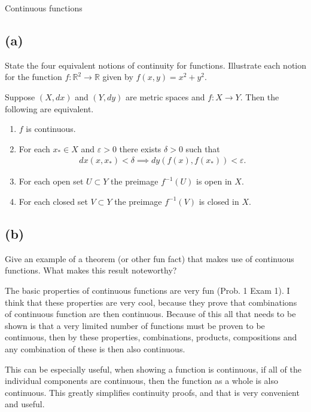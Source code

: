 \documentclass[12pt]{amsart}
\newcommand{\prob}[1]{Prob. #1}
\newcommand{\R}{\mathbb{R}}
\begin{document}
Continuous functions

\subsection*{(a)}%
\label{sub:_a_}

State the four equivalent notions of continuity for functions. Illustrate each
notion for the function $f:\R^2\to\R$ given by $f(x,y)=x^2+y^2$.

Suppose $(X,dx)$ and $(Y,dy)$ are metric spaces and $f:X\to Y$. Then the
following are equivalent.

\begin{enumerate}
  \item $f$ is continuous.
  \item For each $x_*\in X$ and $\varepsilon >0$ there exists $\delta >0$ such
    that
    \begin{align*}
      dx(x,x_*)<\delta\implies dy(f(x),f(x_*))<\varepsilon.
    \end{align*}
  \item For each open set $U\subset Y$ the preimage $f^{-1}(U)$ is open in $X$.
  \item For each closed set $V\subset Y$ the preimage $f^{-1}(V)$ is closed in
    $X$.
\end{enumerate}

\noindent\fbox{\parbox{\textwidth}{$\ $\vspace{4in}}}

\subsection*{(b)}%
\label{sub:_b_}

Give an example of a theorem (or other fun fact) that makes use of continuous
functions. What makes this result noteworthy?

The basic properties of continuous functions are very fun (\prob{1} Exam 1). I
think that these properties are very cool, because they prove that
combinations of continuous function are then continuous. Because of this all
that needs to be shown is that a very limited number of functions must be
proven to be continuous, then by these properties, combinations, products,
compositions and any combination of these is then also continuous.

This can be especially useful, when showing a function is continuous, if all of
the individual components are continuous, then the function as a whole is also
continuous. This greatly simplifies continuity proofs, and that is very
convenient and useful.
\end{document}
